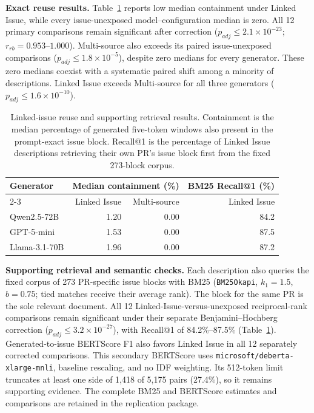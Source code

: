 \documentclass[11pt,a4paper]{article}
\begin{document}
\textbf{Exact reuse results.}
Table~\ref{tab:issue_reuse_summary} reports low median containment under Linked Issue, while every issue-unexposed model--configuration median is zero. All 12 primary comparisons remain significant after correction ($p_{adj}\leq2.1\times10^{-23}$; $r_{rb}=0.953$--$1.000$). Multi-source also exceeds its paired issue-unexposed comparisons ($p_{adj}\leq1.8\times10^{-5}$), despite zero medians for every generator. These zero medians coexist with a systematic paired shift among a minority of descriptions. Linked Issue exceeds Multi-source for all three generators ($p_{adj}\leq1.6\times10^{-10}$).

\begin{table}[htbp]
\centering
\caption{Linked-issue reuse and supporting retrieval results. Containment is the median percentage of generated five-token windows also present in the prompt-exact issue block. Recall@1 is the percentage of Linked Issue descriptions retrieving their own PR's issue block first from the fixed 273-block corpus.}
\label{tab:issue_reuse_summary}
\small
\setlength{\tabcolsep}{5pt}
\begin{tabular}{lrrr}
\toprule
Generator & \multicolumn{2}{c}{Median containment (\%)} & BM25 Recall@1 (\%) \\
\cmidrule(lr){2-3}
 & Linked Issue & Multi-source & Linked Issue \\
\midrule
Qwen2.5-72B & 1.20 & 0.00 & 84.2 \\
GPT-5-mini & 1.53 & 0.00 & 87.5 \\
Llama-3.1-70B & 1.96 & 0.00 & 87.2 \\
\bottomrule
\end{tabular}
\end{table}

\textbf{Supporting retrieval and semantic checks.}
Each description also queries the fixed corpus of 273 PR-specific issue blocks with BM25 (\texttt{BM25Okapi}, $k_1=1.5$, $b=0.75$; tied matches receive their average rank). The block for the same PR is the sole relevant document. All 12 Linked-Issue-versus-unexposed reciprocal-rank comparisons remain significant under their separate Benjamini--Hochberg correction ($p_{adj}\leq3.2\times10^{-27}$), with Recall@1 of 84.2\%--87.5\% (Table~\ref{tab:issue_reuse_summary}). Generated-to-issue BERTScore F1 also favors Linked Issue in all 12 separately corrected comparisons. This secondary BERTScore uses \texttt{microsoft/deberta-xlarge-mnli}, baseline rescaling, and no IDF weighting. Its 512-token limit truncates at least one side of 1,418 of 5,175 pairs (27.4\%), so it remains supporting evidence. The complete BM25 and BERTScore estimates and comparisons are retained in the replication package.
\end{document}
